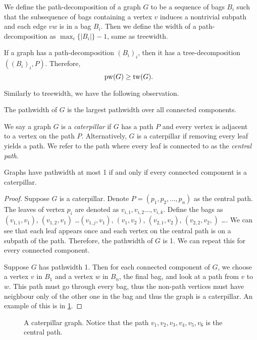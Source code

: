 We define the path-decomposition of a graph \(G\) to be a sequence of bags \(B_i\) such that the subsequence of bags containing a vertex \(v\) induces a nontrivial subpath and each edge \(vw\) is in a bag \(B_i\). Then we define the width of a path-decomposition as \(\max_i \lbrace |B_i| \rbrace -1\), same as treewidth.

If a graph has a path-decomposition \({(B_i)}_i\), then it has a tree-decomposition \(\left({(B_i)}_i, P\right)\). Therefore,
\begin{equation}
	\operatorname{pw}(G) \geq \operatorname{tw}(G).
\end{equation}

Similarly to treewidth, we have the following observation.
\begin{lemma}
	The pathwidth of \(G\) is the largest pathwidth over all connected components.
\end{lemma}
We say a graph \(G\) is a \textit{caterpillar} if \(G\) has a path \(P\) and every vertex is adjacent to a vertex on the path \(P\). Alternatively, \(G\) is a caterpillar if removing every leaf yields a path. We refer to the path where every leaf is connected to as the \textit{central path}.
\begin{theorem}[Caterpillars]
	Graphs have pathwidth at most 1 if and only if every connected component is a caterpillar.
\end{theorem}
\begin{proof}
	Suppose \(G\) is a caterpillar.
	Denote \(P =\left( p_1, p_2, \dots, p_n\right)\) as the central path. The leaves of vertex \(p_i\) are denoted as \(v_{i, 1}, v_{i, 2} \dots, v_{i, k}\). Define the bags as \((v_{1, 1}, v_1)\), \((v_{1, 2}, v_1)\) \dots \((v_{1, j}, v_1)\),  \((v_1, v_2)\), \((v_{2, 1}, v_2)\), \((v_{2,2}, v_2,)\) \dots. We can see that each leaf appears once and each vertex on the central path is on a subpath of the path. Therefore, the pathwidth of \(G\) is 1. We can repeat this for every connected component.
	\par
	Suppose \(G\) has pathwidth 1. Then for each connected component of \(G\), we choose a vertex \(v\) in \(B_1\) and a vertex \(w\) in \(B_n\), the final bag, and look at a path from \(v\) to \(w\). This path must go through every bag, thus the non-path vertices must have neighbour only of the other one in the bag and thus the graph is a caterpillar. An example of this is in \cref{fig:caterpillar}.
\end{proof}
\begin{figure}[ht]
	\centering
	
	\caption{A caterpillar graph. Notice that the path \(v_1, v_2, v_3, v_4, v_5, v_6\) is the central path.}
	\label{fig:caterpillar}
\end{figure}

